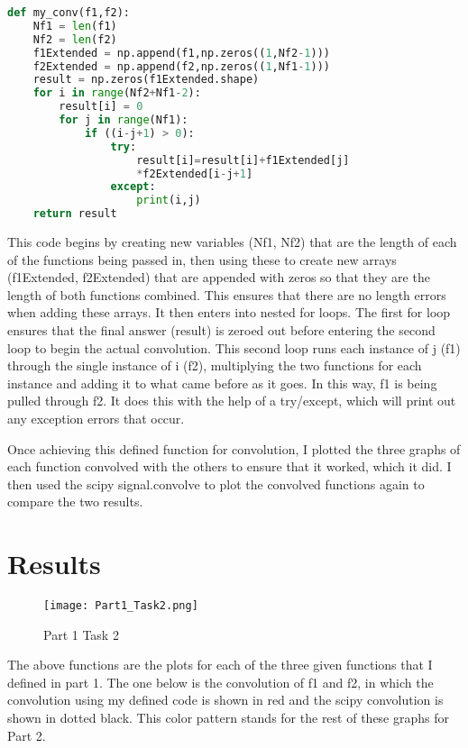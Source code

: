 \documentclass[12pt]{report}
\begin{document}
\begin{lstlisting}[language=Python]
def my_conv(f1,f2):
    Nf1 = len(f1)
    Nf2 = len(f2)
    f1Extended = np.append(f1,np.zeros((1,Nf2-1)))
    f2Extended = np.append(f2,np.zeros((1,Nf1-1)))
    result = np.zeros(f1Extended.shape)
    for i in range(Nf2+Nf1-2):
        result[i] = 0
        for j in range(Nf1):
            if ((i-j+1) > 0):
                try:
                    result[i]=result[i]+f1Extended[j]
                    *f2Extended[i-j+1]
                except:
                    print(i,j)
    return result
\end{lstlisting}

This code begins by creating new variables (Nf1, Nf2) that are the length of each of the functions being passed in, then using these to create new arrays (f1Extended, f2Extended) that are appended with zeros so that they are the length of both functions combined. This ensures that there are no length errors when adding these arrays. It then enters into nested for loops. The first for loop ensures that the final answer (result) is zeroed out before entering the second loop to begin the actual convolution. This second loop runs each instance of j (f1) through the single instance of i (f2), multiplying the two functions for each instance and adding it to what came before as it goes. In this way, f1 is being pulled through f2. It does this with the help of a try/except, which will print out any exception errors that occur. 

Once achieving this defined function for convolution, I plotted the three graphs of each function convolved with the others to ensure that it worked, which it did. I then used the scipy signal.convolve to plot the convolved functions again to compare the two results. 
 
 \section{Results}
 
 \begin{figure}[H]
    \centering
    \texttt{[image: Part1\_Task2.png]}
    \caption{Part 1 Task 2}
\end{figure}

The above functions are the plots for each of the three given functions that I defined in part 1. The one below is the convolution of f1 and f2, in which the convolution using my defined code is shown in red and the scipy convolution is shown in dotted black. This color pattern stands for the rest of these graphs for Part 2.
\end{document}
